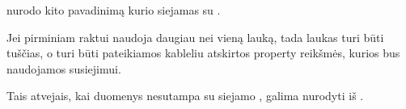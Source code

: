 \documentclass[letterpaper,10pt,lithuanian]{sphinxmanual}
\begin{document}
\begin{fulllineitems}

\pysigstartsignatures
\pysigline
{}
\pysigstopsignatures

\begin{fulllineitems}

\pysigstartsignatures
\pysigline
{}
\pysigstopsignatures
\sphinxAtStartPar
{} nurodo kito {\hyperref[\detokenize{formatas:model}]{}} pavadinimą kurio {\hyperref[\detokenize{dimensijos:model.ref}]{}}
siejamas su {\hyperref[\detokenize{formatas:property}]{}}.

\sphinxAtStartPar
Jei {\hyperref[\detokenize{dimensijos:model.ref}]{}} pirminiam raktui naudoja daugiau nei vieną lauką,
tada {\hyperref[\detokenize{dimensijos:property.source}]{}} laukas turi būti tuščias, o
{\hyperref[\detokenize{dimensijos:property.prepare}]{}} turi būti pateikiamos kableliu atskirtos
property reikšmės, kurios bus naudojamos susiejimui.

\end{fulllineitems}



\begin{fulllineitems}

\pysigstartsignatures
\pysigline
{}
\pysigstopsignatures
\sphinxAtStartPar
Tais atvejais, kai {\hyperref[\detokenize{formatas:property}]{}} duomenys nesutampa su siejamo
{\hyperref[\detokenize{dimensijos:model.ref}]{}}, galima nurodyti {\hyperref[\detokenize{formatas:property}]{}} iš {\hyperref[\detokenize{formatas:model}]{}}.

\end{fulllineitems}



\begin{fulllineitems}


\end{fulllineitems}
\end{fulllineitems}
\end{document}
